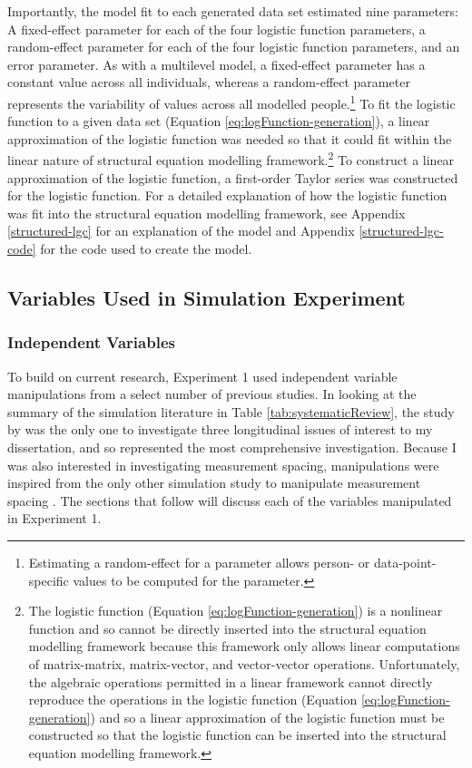 \documentclass[
12pt, %
twoside,
english]{guelphthesis}
\begin{document}
\noindent Importantly, the model fit to each generated data set estimated nine parameters: A fixed-effect parameter for each of the four logistic function parameters, a random-effect parameter for each of the four logistic function parameters, and an error parameter. As with a multilevel model, a fixed-effect parameter has a constant value across all individuals, whereas a random-effect parameter represents the variability of values across all modelled people.\footnote{Estimating a random-effect for a parameter allows person- or data-point-specific values to be computed for the parameter.} To fit the logistic function to a given data set (Equation \ref{eq:logFunction-generation}), a linear approximation of the logistic function was needed so that it could fit within the linear nature of structural equation modelling framework.\footnote{The logistic function (Equation \ref{eq:logFunction-generation}) is a nonlinear function and so cannot be directly inserted into the structural equation modelling framework because this framework only allows linear computations of matrix-matrix, matrix-vector, and vector-vector operations. Unfortunately, the algebraic operations permitted in a linear framework cannot directly reproduce the operations in the logistic function (Equation \ref{eq:logFunction-generation}) and so a linear approximation of the logistic function must be constructed so that the logistic function can be inserted into the structural equation modelling framework.} To construct a linear approximation of the logistic function, a first-order Taylor series was constructed for the logistic function. For a detailed explanation of how the logistic function was fit into the structural equation modelling framework, see Appendix \ref{structured-lgc} for an explanation of the model and Appendix \ref{structured-lgc-code} for the code used to create the model.

\hypertarget{variables-used-in-simulation-experiment}{%
\subsection{Variables Used in Simulation Experiment}\label{variables-used-in-simulation-experiment}}

\hypertarget{independent-variables}{%
\subsubsection{Independent Variables}\label{independent-variables}}

To build on current research, Experiment 1 used independent variable manipulations from a select number of previous studies. In looking at the summary of the simulation literature in Table \ref{tab:systematicReview}, the study by \textcite{coulombe2016} was the only one to investigate three longitudinal issues of interest to my dissertation, and so represented the most comprehensive investigation. Because I was also interested in investigating measurement spacing, manipulations were inspired from the only other simulation study to manipulate measurement spacing \autocite[the study by][]{timmons2015}. The sections that follow will discuss each of the variables manipulated in Experiment 1.
\end{document}
